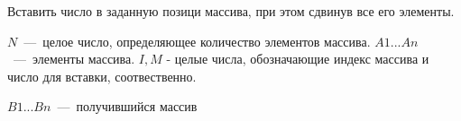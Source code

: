 Вставить число в заданную позици массива, при этом сдвинув все его элементы. 

\InputFile

$N$~---~целое число, определяющее количество элементов массива.
$A1...An$~---~элементы массива. 
$I, M$ - целые числа, обозначающие индекс массива и число для вставки, соотвественно. 
\OutputFile

$B1...Bn$~---~получившийся массив

\SAMPLES
